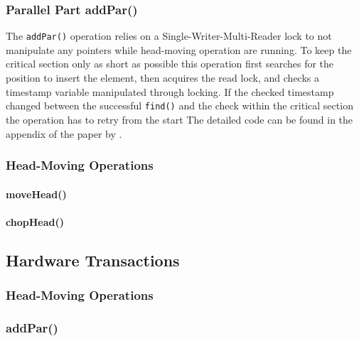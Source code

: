 \subsubsection{Parallel Part addPar()}

The \texttt{addPar()} operation relies on a Single-Writer-Multi-Reader lock to not manipulate any pointers while head-moving operation are running. To keep the critical section only as short as possible this operation first searches for the position to insert the element, then acquires the read lock, and checks a timestamp variable manipulated through locking. If the checked timestamp changed between the successful \texttt{find()} and the check within the critical section the operation has to retry from the start The detailed code can be found in the appendix of the paper by  \citeauthor{calciu_adaptive_2014-1} \cite{calciu_adaptive_2014-1}.

\subsubsection{Head-Moving Operations}

\paragraph{moveHead()}

\paragraph{chopHead()}


\subsection{Hardware Transactions}

\subsubsection{Head-Moving Operations}

\subsubsection{addPar()}
